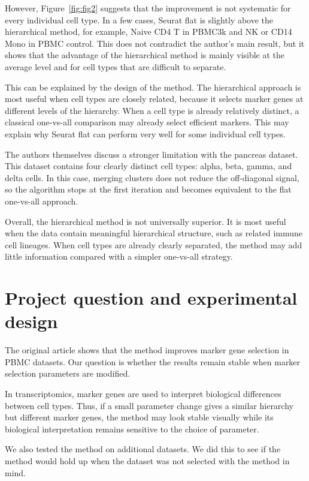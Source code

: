 \documentclass[11pt,a4paper]{article}
\begin{document}
However, Figure~\ref{fig:fig2} suggests that the improvement is not systematic for every individual cell type.
In a few cases, Seurat flat is slightly above the hierarchical method, for example, Naive CD4 T in PBMC3k and NK or CD14 Mono in PBMC control.
This does not contradict the author's main result, but it shows that the advantage of the hierarchical method is mainly visible at the average level and for cell types that are difficult to separate.

This can be explained by the design of the method.
The hierarchical approach is most useful when cell types are closely related, because it selects marker genes at different levels of the hierarchy.
When a cell type is already relatively distinct, a classical one-vs-all comparison may already select efficient markers.
This may explain why Seurat flat can perform very well for some individual cell types.

The authors themselves discuss a stronger limitation with the pancreas dataset.
This dataset contains four clearly distinct cell types: alpha, beta, gamma, and delta cells.
In this case, merging clusters does not reduce the off-diagonal signal, so the algorithm stops at the first iteration and becomes equivalent to the flat one-vs-all approach.

Overall, the hierarchical method is not universally superior.
It is most useful when the data contain meaningful hierarchical structure, such as related immune cell lineages.
When cell types are already clearly separated, the method may add little information compared with a simpler one-vs-all strategy.


\section{Project question and experimental design}

The original article shows that the method improves marker gene selection in PBMC datasets. Our question is whether the results remain stable when marker selection parameters are modified.

In transcriptomics, marker genes are used to interpret biological differences between cell types.
Thus, if a small parameter change gives a similar hierarchy but different marker genes, the method may look stable visually while its biological interpretation remains sensitive to the choice of parameter.

We also tested the method on additional datasets.
We did this to see if the method would hold up when the dataset was not selected with the method in mind.
\end{document}

